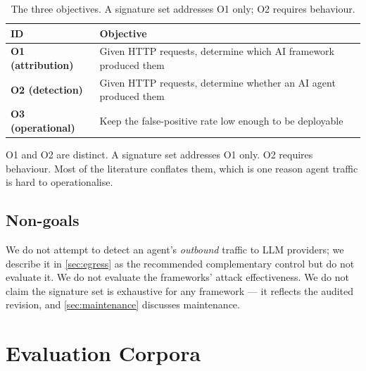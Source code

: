 \documentclass[11pt]{article}
\begin{document}
\begin{table}[t]
\centering
\caption{The three objectives. A signature set addresses O1 only; O2 requires behaviour.}
\label{tab:objectives}
\begin{tabularx}{\textwidth}{@{}L{0.30\textwidth}Y@{}}
\toprule
\textbf{ID} & \textbf{Objective} \\
\midrule
\textbf{O1 (attribution)} & Given HTTP requests, determine which AI framework produced them \\
\textbf{O2 (detection)} & Given HTTP requests, determine whether an AI agent produced them \\
\textbf{O3 (operational)} & Keep the false-positive rate low enough to be deployable \\
\bottomrule
\end{tabularx}
\end{table}

O1 and O2 are distinct. A signature set addresses O1 only. O2 requires behaviour. Most of the
literature conflates them, which is one reason agent traffic is hard to operationalise.

\subsection{Non-goals}
\label{sec:nongoals}

We do not attempt to detect an agent's \emph{outbound} traffic to LLM providers; we describe it
in \ref{sec:egress} as the recommended complementary control but do not evaluate it. We do not
evaluate the frameworks' attack effectiveness. We do not claim the signature set is exhaustive
for any framework --- it reflects the audited revision, and \ref{sec:maintenance} discusses
maintenance.

\section{Evaluation Corpora}
\label{sec:corpora}
\end{document}

